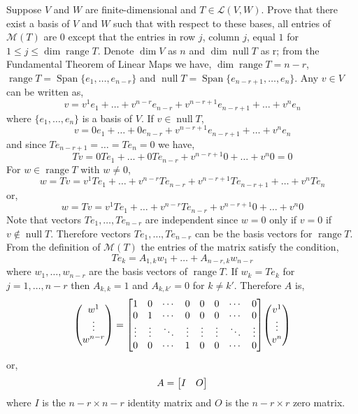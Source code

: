 \documentclass[11pt,a4paper]{scrartcl}
\DeclareMathOperator{\range}{range}
\DeclareMathOperator{\nspace}{null}
\DeclareMathOperator{\Span}{Span}
\newcommand{\lmap}[2]{\mathcal{L}(#1,#2)}
\newcounter{problem}
\begin{document}
\begin{problem}[3.C.3]
{
    Suppose $V$ and $W$ are finite-dimensional and $T \in \lmap{V}{W}$.
    Prove that there exist a basis of $V$ and $W$ such that with respect
    to these bases, all entries of $\mathcal{M}(T)$ are 0 except that the entries in row $j$, column $j$, equal $1$ for $1\leq j\leq \dim \range T$. 
}
{
    Denote $\dim V$ as $n$ and $\dim\nspace T$ as r;
    from the Fundamental Theorem of Linear Maps we have,
    $\dim \range T = n-r$, 
     $\range T=\Span\{e_{1},\ldots,e_{n-r} \}$ and 
     $\nspace T = \Span\{e_{n-r+1},\ldots,e_n\}$. 
    Any $v \in V$ can be written as,
    \[
    v=v^1 e_1 + \ldots + v^{n-r} e_{n-r} + v^{n-r+1} e_{n-r+1} + \ldots + v^n e_n
    \]
    where $\{e_1,\ldots,e_n\}$ is a basis of $V$. If 
    $v \in \nspace T$,
    \[
    v =0 e_1 + \ldots + 0 e_{n-r}+ v^{n-r+1} e_{n-r+1} + \ldots + v^n e_n 
    \]
    and since $Te_{n-r+1}=\ldots=Te_n=0$ we have,
    \[
     Tv = 0 Te_1 + \ldots + 0 Te_{n-r} + v^{n-r+1} 0 + \ldots + v^{n} 0 = 0
    \]
    For $w \in \range T$ with $w\neq 0$,
    \[
    w = Tv = v^1 Te_1 + \ldots + v^{n-r} Te_{n-r} + v^{n-r+1} Te_{n-r+1} +
    \ldots + v^n Te_n
    \]
    or,
    \[
    w = Tv = v^1 Te_1 + \ldots + v^{n-r} Te_{n-r} + v^{n-r+1} 0 +
    \ldots + v^n 0
    \]
    Note that vectors $Te_1,\ldots,Te_{n-r}$ are independent since
    $w=0$ only if $v=0$ if $v \notin \nspace T$. 
    Therefore vectors $Te_1,\ldots,Te_{n-r}$ can be
    the basis vectors for $\range T$. From the definition of $\mathcal{M}(T)$ the entries
    of the matrix satisfy the condition,
    \[
    Te_k = A_{1,k}w_1 + \ldots + A_{n-r,k}w_{n-r}
    \]
    where $w_1,\ldots,w_{n-r}$ are the basis
    vectors of $\range T$. If $w_k=Te_k$
    for $j=1,\ldots,n-r$ then $A_{k,k}=1$
    and $A_{k,k'}=0$ for $k\neq k'$.
    Therefore $A$ is,
     \[
    \mqty(w^1 \\ \vdots \\ w^{n-r})=
    \mqty[
    1 & 0 & \cdots & 0 & 0 & 0 & \cdots & 0  \\
    0 & 1 & \cdots & 0 & 0 & 0 &\cdots & 0 \\
    \vdots & \vdots & \ddots & \vdots & \vdots & \vdots & \ddots & \vdots \\
    0 & 0 & \cdots & 1 & 0 & 0 &  \cdots & 0
    ]
    \mqty(v^1 \\ \vdots \\ v^n)
    \]   
    or,
    \[
    A = \mqty[I & O] 
    \]
    where $I$ is the $n-r \times n-r$ identity matrix
    and $O$ is the $n-r \times r$ zero matrix.
}
\end{problem}
\end{document}
